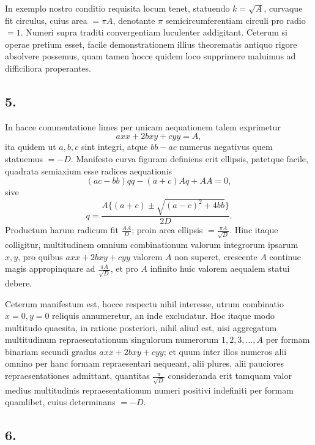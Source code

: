 \documentclass[12pt]{article}
\begin{document}
In exemplo nostro conditio requisita locum tenet, statuendo $k=\sqrt A$, curvaque fit circulus, cuius area $=\pi A$, denotante $\pi$ semicircumferentiam circuli pro radio $=1$. Numeri supra traditi convergentiam luculenter addigitant. Ceterum si operae pretium esset, facile demonstrationem illius theorematis antiquo rigore absolvere possemus, quam tamen hocce quidem loco supprimere maluimus ad difficiliora properantes.

\subsection*{5.}

In hacce commentatione limes per unicam aequationem talem exprimetur
\[
axx+2bxy+cyy=A,
\]
ita quidem ut $a,b,c$ sint integri, atque $bb-ac$ numerus negativus quem statuemus $=-D$. Manifesto curva figuram definiens erit ellipsis, patetque facile, quadrata semiaxium esse radices aequationis
\[
(ac-bb)qq-(a+c)Aq+AA=0,
\]
sive
\[
q=\frac{A\{(a+c)\pm \sqrt{(a-c)^2+4bb}\}}{2D}.
\]
Productum harum radicum fit $\frac{AA}{D}$; proin area ellipsis $=\frac{\pi A}{\sqrt D}$. Hinc itaque colligitur, multitudinem omnium combinationum valorum integrorum ipsarum $x,y$, pro quibus $axx+2bxy+cyy$ valorem $A$ non superet, crescente $A$ continue magis appropinquare ad $\frac{\pi A}{\sqrt D}$, et pro $A$ infinito huic valorem aequalem statui debere.

Ceterum manifestum est, hocce respectu nihil interesse, utrum combinatio $x=0,y=0$ reliquis annumeretur, an inde excludatur. Hoc itaque modo multitudo quaesita, in ratione posteriori, nihil aliud est, nisi aggregatum multitudinum repraesentationum singulorum numerorum $1,2,3,\ldots,A$ per formam binariam secundi gradus $axx+2bxy+cyy$; et quum inter illos numeros alii omnino per hanc formam repraesentari nequeant, alii plures, alii pauciores repraesentationes admittant, quantitas $\frac{\pi}{\sqrt D}$ consideranda erit tamquam valor medius multitudinis repraesentationum numeri positivi indefiniti per formam quamlibet, cuius determinans $=-D$.

\subsection*{6.}
\end{document}
